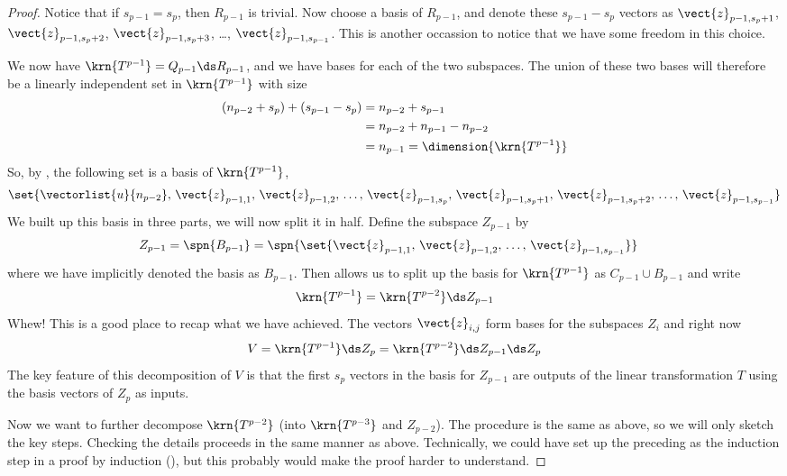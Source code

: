 \begin{proof}
%
Notice that if $s_{p-1}=s_p$, then $R_{p-1}$ is trivial.   Now choose a basis of $R_{p-1}$, and denote these $s_{p-1}-s_p$ vectors as $\vect{z}_{p-1,s_p+1}$, $\vect{z}_{p-1,s_p+2}$, $\vect{z}_{p-1,s_p+3}$, \dots, $\vect{z}_{p-1,s_{p-1}}$.  This is another occassion to notice that we have some freedom in this choice.\par
%
We now have $\krn{T^{p-1}}=Q_{p-1}\ds R_{p-1}$, and we have bases for each of the two subspaces.  The union of these two bases will therefore be a linearly independent set in $\krn{T^{p-1}}$ with size
%
\begin{align*}
\left(n_{p-2}+s_p\right)+\left(s_{p-1}-s_p\right)
&=n_{p-2}+s_{p-1}\\
&=n_{p-2}+n_{p-1}-n_{p-2}\\
&=n_{p-1}=\dimension{\krn{T^{p-1}}}
\end{align*}
%
So, by , the following set is a basis of $\krn{T^{p-1}}$,
%
\begin{align*}
\set{
\vectorlist{u}{n_{p-2}},\,
\vect{z}_{p-1,1},\,\vect{z}_{p-1,2},\,\dots,\,\vect{z}_{p-1,s_p},\,
\vect{z}_{p-1,s_p+1},\,\vect{z}_{p-1,s_p+2},\,\dots,\,\vect{z}_{p-1,s_{p-1}}
}
\end{align*}
%
We built up this basis in three parts, we will now split it in half.  Define the subspace $Z_{p-1}$ by
%
\begin{align*}
Z_{p-1}
&=\spn{B_{p-1}}=
\spn{\set{
\vect{z}_{p-1,1},\,\vect{z}_{p-1,2},\,\dots,\,\vect{z}_{p-1,s_{p-1}}
}}
\end{align*}
%
where we have implicitly denoted the basis as $B_{p-1}$.  Then  allows us to split up the basis for $\krn{T^{p-1}}$ as $C_{p-1}\cup B_{p-1}$ and write
%
\begin{align*}
\krn{T^{p-1}}=\krn{T^{p-2}}\ds Z_{p-1}
\end{align*}
%
Whew!  This is a good place to recap what we have achieved.  The vectors $\vect{z}_{i,j}$ form bases for the subspaces $Z_i$ and right now
%
\begin{align*}
V=\krn{T^{p-1}}\ds Z_{p}=\krn{T^{p-2}}\ds Z_{p-1}\ds Z_{p}
\end{align*}
%
The key feature of this decomposition of $V$ is that the first $s_p$ vectors in the basis for $Z_{p-1}$ are outputs of the linear transformation $T$ using the basis vectors of $Z_p$ as inputs.\par
%
Now we want to further decompose $\krn{T^{p-2}}$ (into $\krn{T^{p-3}}$ and $Z_{p-2}$).  The procedure is the same as above, so we will only sketch the key steps.  Checking the details proceeds in the same manner as above.  Technically, we could have set up the preceding as the induction step in a proof by induction (), but this probably would make the proof harder to understand.\par

\end{proof}
